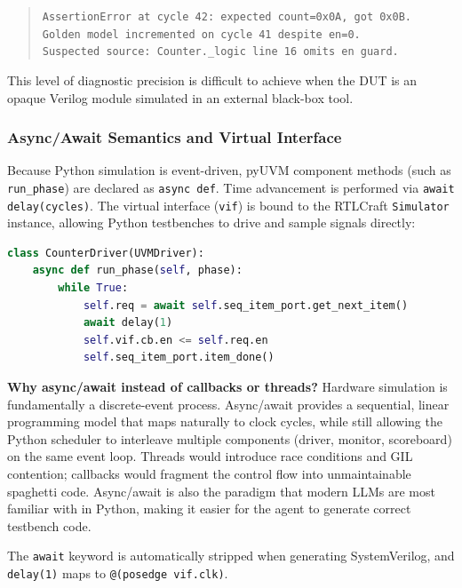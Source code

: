 \documentclass[11pt]{article}
\begin{document}
\begin{quote}
\small\texttt{AssertionError at cycle 42: expected count=0x0A, got 0x0B. \\ Golden model incremented on cycle 41 despite \texttt{en}=0. \\ Suspected source: Counter.\_logic line 16 omits \texttt{en} guard.}
\end{quote}

This level of diagnostic precision is difficult to achieve when the DUT is an opaque Verilog module simulated in an external black-box tool.

\subsubsection{Async/Await Semantics and Virtual Interface}

Because Python simulation is event-driven, pyUVM component methods (such as \texttt{run\_phase}) are declared as \texttt{async def}. Time advancement is performed via \texttt{await delay(cycles)}. The virtual interface (\texttt{vif}) is bound to the RTLCraft \texttt{Simulator} instance, allowing Python testbenches to drive and sample signals directly:

\begin{lstlisting}[language=Python, caption={pyUVM Driver snippet}, label={lst:driver}]
class CounterDriver(UVMDriver):
    async def run_phase(self, phase):
        while True:
            self.req = await self.seq_item_port.get_next_item()
            await delay(1)
            self.vif.cb.en <= self.req.en
            self.seq_item_port.item_done()
\end{lstlisting}

\textbf{Why async/await instead of callbacks or threads?} Hardware simulation is fundamentally a discrete-event process. Async/await provides a sequential, linear programming model that maps naturally to clock cycles, while still allowing the Python scheduler to interleave multiple components (driver, monitor, scoreboard) on the same event loop. Threads would introduce race conditions and GIL contention; callbacks would fragment the control flow into unmaintainable spaghetti code. Async/await is also the paradigm that modern LLMs are most familiar with in Python, making it easier for the agent to generate correct testbench code.

The \texttt{await} keyword is automatically stripped when generating SystemVerilog, and \texttt{delay(1)} maps to \texttt{@(posedge vif.clk)}.
\end{document}
